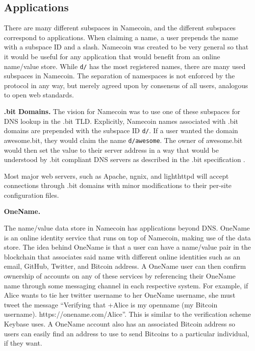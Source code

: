 \subsection{Applications}

There are many different subspaces in Namecoin, and the different subspaces correspond to applications. When claiming a name, a user prepends the name with a subspace ID and a slash. Namecoin was created to be very general so that it would be useful for any application that would benefit from an online name/value store. While {\tt d/} has the most registered names, there are many used subspaces in Namecoin. The separation of namespaces is not enforced by the protocol in any way, but merely agreed upon by consensus of all users, analogous to open web standards.

{\bf .bit Domains.}
The vision for Namecoin was to use one of these subspaces for DNS lookup in the .bit TLD. Explicitly, Namecoin names associated with .bit domains are prepended with the subspace ID {\tt d/}. If a user wanted the domain awesome.bit, they would claim the name {\tt d/awesome}. The owner of awesome.bit would then set the value to their server address in a way that would be understood by .bit compliant DNS servers as described in the .bit specification \cite{bitdnsspec}.

Most major web servers, such as Apache, ngnix, and lighthttpd will accept connections through .bit domains with minor modifications to their per-site configuration files.

{\bf OneName.}

The name/value data store in Namecoin has applications beyond DNS. OneName is an online identity service that runs on top of Namecoin, making use of the data store. The idea behind OneName is that a user can have a name/value pair in the blockchain that associates said name with different online identities such as an email, GitHub, Twitter, and Bitcoin address. A OneName user can then confirm ownership of accounts on any of these services by referencing their OneName name through some messaging channel in each respective system. For example, if Alice wants to tie her twitter username to her OneName username, she must tweet the message ``Verifying that +Alice is my openname (my Bitcoin username). https://onename.com/Alice''. This is similar to the verification scheme Keybase uses. A OneName account also has an associated Bitcoin address so users can easily find an address to use to send Bitcoins to a particular individual, if they want.

